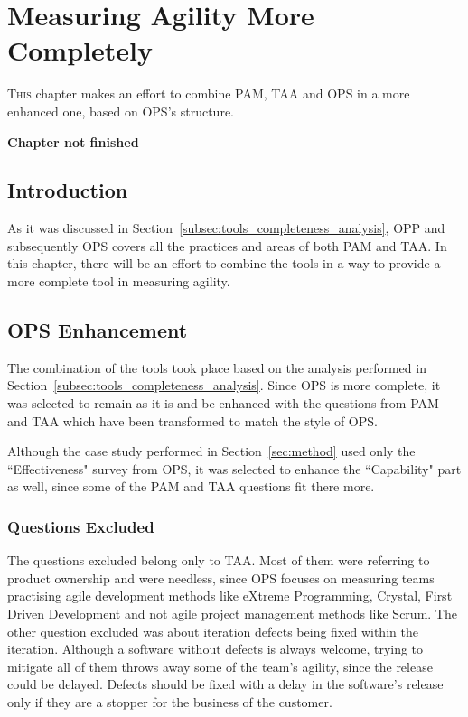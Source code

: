 \chapter{Measuring Agility More Completely}
\label{ch:enhancing_ops}

\lettrine[lines=2, loversize=-0.1, lraise=0.1]{T}{his} chapter makes an effort to combine \ac{PAM}, \ac{TAA} and \ac{OPS} in a more enhanced one, based on \ac{OPS}'s structure. 

\bigskip

\textbf{Chapter not finished}

\section{Introduction}
As it was discussed in Section~\ref{subsec:tools_completeness_analysis}, \ac{OPP} and subsequently \ac{OPS} covers all the practices and areas of both \ac{PAM} and \ac{TAA}. In this chapter, there will be an effort to combine the tools in a way to provide a more complete tool in measuring agility.

\section{\ac{OPS} Enhancement}
The combination of the tools took place based on the analysis performed in Section~\ref{subsec:tools_completeness_analysis}. Since \ac{OPS} is more complete, it was selected to remain as it is and be enhanced with the questions from \ac{PAM} and \ac{TAA} which have been transformed to match the style of \ac{OPS}.

Although the case study performed in Section~\ref{sec:method} used only the ``Effectiveness" survey from \ac{OPS}, it was selected to enhance the ``Capability" part as well, since some of the \ac{PAM} and \ac{TAA} questions fit there more.

\subsection{Questions Excluded}
The questions excluded belong only to \ac{TAA}. Most of them were referring to product ownership and were needless, since \ac{OPS} focuses on measuring teams practising agile development methods like eXtreme Programming, Crystal, First Driven Development and not agile project management methods like Scrum. The other question excluded was about iteration defects being fixed within the iteration. Although a software without defects is always welcome, trying to mitigate all of them throws away some of the team's agility, since the release could be delayed. Defects should be fixed with a delay in the software's release only if they are a stopper for the business of the customer.

